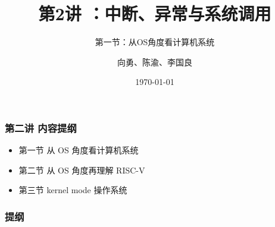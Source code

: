 


\title[第2讲]{第2讲 ：中断、异常与系统调用 } %
\subtitle{第一节：从OS角度看计算机系统}
\author{向勇、陈渝、李国良} %
\date{\today} %



\begin{frame}
\titlepage %
\end{frame}
\begin{frame}
    \frametitle{第二讲 内容提纲}
    \begin{itemize}
        \item 第一节 从 OS 角度看计算机系统
        \item 第二节 从 OS 角度再理解 RISC-V
        \item 第三节 kernel mode 操作系统
    \end{itemize}
\end{frame}

\begin{frame}
\frametitle{提纲} %
\tableofcontents %
\end{frame}

